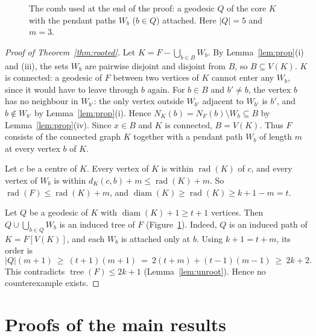 \documentclass[11pt,a4paper]{article}
\theoremstyle{definition}
\newcommand{\rad}{\operatorname{rad}}
\newcommand{\diam}{\operatorname{diam}}
\newcommand{\tr}{\operatorname{tree}}
\begin{document}
\begin{figure}[t]
\centering
{}
\caption{The comb used at the end of the proof: a geodesic $Q$ of the core $K$ with the pendant paths $W_b$ ($b\in Q$) attached. Here $|Q|=5$ and $m=3$.}\label{fig:comb}
\end{figure}

\begin{proof}[Proof of Theorem~\ref{thm:rooted}]
Let $K=F-\bigcup_{b\in B}W_b$. By Lemma~\ref{lem:prop}(i) and (iii), the sets $W_b$ are pairwise disjoint and disjoint from $B$, so $B\subseteq V(K)$. $K$ is connected: a geodesic of $F$ between two vertices of $K$ cannot enter any $W_b$, since it would have to leave through $b$ again. For $b\in B$ and $b'\ne b$, the vertex $b$ has no neighbour in $W_{b'}$: the only vertex outside $W_{b'}$ adjacent to $W_{b'}$ is $b'$, and $b\notin W_{b'}$ by Lemma~\ref{lem:prop}(i). Hence $N_K(b)=N_F(b)\setminus W_b\subseteq B$ by Lemma~\ref{lem:prop}(iv). Since $x\in B$ and $K$ is connected, $B=V(K)$. Thus $F$ consists of the connected graph $K$ together with a pendant path $W_b$ of length $m$ at every vertex $b$ of $K$.

Let $c$ be a centre of $K$. Every vertex of $K$ is within $\rad(K)$ of $c$, and every vertex of $W_b$ is within $d_K(c,b)+m\le\rad(K)+m$. So $\rad(F)\le\rad(K)+m$, and $\diam(K)\ge\rad(K)\ge k+1-m=t$.

Let $Q$ be a geodesic of $K$ with $\diam(K)+1\ge t+1$ vertices. Then $Q\cup\bigcup_{b\in Q}W_b$ is an induced tree of $F$ (Figure~\ref{fig:comb}). Indeed, $Q$ is an induced path of $K=F[V(K)]$, and each $W_b$ is attached only at $b$. Using $k+1=t+m$, its order is
\[
|Q|(m+1)\ \ge\ (t+1)(m+1)\ =\ 2(t+m)+(t-1)(m-1)\ \ge\ 2k+2 .
\]
This contradicts $\tr(F)\le2k+1$ (Lemma~\ref{lem:unroot}). Hence no counterexample exists.
\end{proof}

\section{Proofs of the main results}\label{sec:main}
\end{document}
